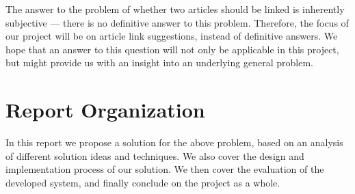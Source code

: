 The answer to the problem of whether two articles should be linked is inherently subjective --- there is no definitive answer to this problem. Therefore, the focus of our project will be on article link suggestions, instead of definitive answers. We hope that an answer to this question will not only be applicable in this project, but might provide us with an insight into an underlying general problem.








\section{Report Organization}
In this report we propose a solution for the above problem, based on an analysis of different solution ideas and techniques. We also cover the design and implementation process of our solution. We then cover the evaluation of the developed system, and finally conclude on the project as a whole. 

